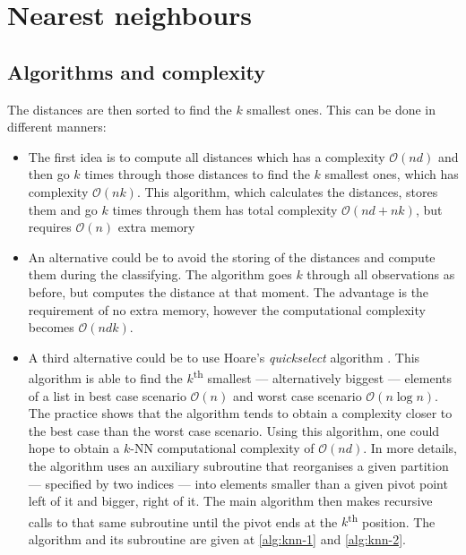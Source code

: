 \section{Nearest neighbours}

\subsection{Algorithms and complexity}
The distances are then sorted to find the $k$ smallest ones. This can be done in different manners:
\begin{itemize}
    \item The first idea is to compute all distances which has a complexity $\mathcal{O}\left(nd\right)$ and then go $k$ times through those distances to find the $k$ smallest ones, which has complexity $\mathcal{O}\left(nk\right)$. This algorithm, which calculates the distances, stores them and go $k$ times through them has total complexity $\mathcal{O}\left(nd+nk\right)$, but requires $\mathcal{O}\left(n\right)$ extra memory
    \item An alternative could be to avoid the storing of the distances and compute them during the classifying. The algorithm goes $k$ through all observations as before, but computes the distance at that moment. The advantage is the requirement of no extra memory, however the computational complexity becomes $\mathcal{O}\left(ndk\right)$.
    \item A third alternative could be to use Hoare's \emph{quickselect} algorithm \cite{Hoare:1961:AF:366622.366647}. This algorithm is able to find the $k$\textsuperscript{th} smallest --- alternatively biggest --- elements of a list in best case scenario $\mathcal{O}\left(n\right)$ and worst case scenario $\mathcal{O}\left(n \log n\right)$. The practice shows that the algorithm tends to obtain a complexity closer to the best case than the worst case scenario. Using this algorithm, one could hope to obtain a $k$-NN computational complexity of $\mathcal{O}\left(nd\right)$. In more details, the algorithm uses an auxiliary subroutine that reorganises a given partition --- specified by two indices --- into elements smaller than a given pivot point left of it and bigger, right of it. The main algorithm then makes recursive calls to that same subroutine until the pivot ends at the $k$\textsuperscript{th} position. The algorithm and its subroutine are given at \ref{alg:knn-1} and \ref{alg:knn-2}.
\end{itemize}

